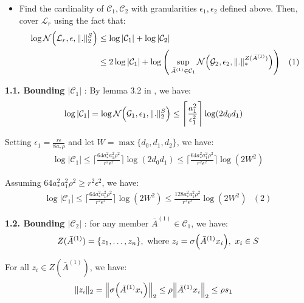\begin{itemize}
    \item Find the cardinality of $\mathcal{C}_1, \mathcal{C}_2$ with granularities $\epsilon_1, \epsilon_2$ defined above. Then, cover $\mathcal{L}_r$ using the fact that:
    \begin{align*}
        \log\mathcal{N}\Big( \mathcal{L}_r, \epsilon, \|.\|_2^S \Big) &\le \log |\mathcal{C}_1| + \log |\mathcal{C}_2| \\
            &\le 2\log|\mathcal{C}_1| + \log\Bigg( 
                \sup_{\bar A^{(1)} \in \mathcal{C}_1} \mathcal{N}\Big( 
                    \mathcal{G}_2, \epsilon_2, \|.\|_*^{Z(\bar A^{(1)})}
                 \Big)
             \Bigg)  \ \ \ (1) 
    \end{align*}
\end{itemize}

\noindent\newline\textbf{1.1. Bounding $|\mathcal{C}_1|$} : By lemma 3.2 in \cite{article:bartlett}, we have:
\begin{align*}
    \log|\mathcal{C}_1| &= \log\mathcal{N}\Big( \mathcal{G}_1, \epsilon_1, \|.\|_2^S \Big) \le \Bigg\lceil
        \frac{a_1^2}{\epsilon_1^2}
    \Bigg\rceil\log(2d_0d_1)
\end{align*} 

\noindent Setting $\epsilon_1=\frac{r\epsilon}{8a_*\rho}$ and let $W=\max\{d_0, d_1, d_2 \}$, we have:
\begin{align*}
    \log |\mathcal{C}_1| \le \Bigg\lceil
        \frac{64a_*^2a_1^2\rho^2}{r^2\epsilon^2}
    \Bigg\rceil\log(2d_0d_1) \le 
    \Bigg\lceil
        \frac{64a_*^2a_1^2\rho^2}{r^2\epsilon^2}
    \Bigg\rceil\log(2W^2)
\end{align*}

\noindent Assuming $64a_*^2a_1^2\rho^2 \ge r^2\epsilon^2$, we have:
\begin{align*}
    \log |\mathcal{C}_1| \le \Bigg\lceil
        \frac{64a_*^2a_1^2\rho^2}{r^2\epsilon^2}
    \Bigg\rceil\log(2W^2) \le \frac{128a_*^2a_1^2\rho^2}{r^2\epsilon^2}\log(2W^2) \ \ \ (2)
\end{align*}

\noindent\newline\textbf{1.2. Bounding $|\mathcal{C}_2|$} : for any member $\bar A^{(1)}\in \mathcal{C}_1$, we have: 
\begin{align*}
    Z(\bar A^{(1)}) = \{z_1, \dots, z_n\}, \text{ where } z_i = \sigma\Big( \bar A^{(1)}x_i \Big), \ x_i\in S
\end{align*}

\noindent For all $z_i \in Z(\bar A^{(1)})$, we have:
\begin{align*}
    \|z_i\|_2 &= \Big\| \sigma\Big( \bar A^{(1)} x_i \Big) \Big\|_2 \le \rho\Big\|\bar A^{(1)}x_i\Big\|_2 \le \rho s_1
\end{align*}

